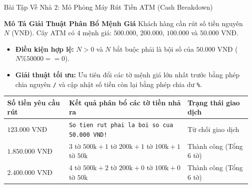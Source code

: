 \documentclass[aspectratio=169, 10pt]{beamer}
\begin{document}
\begin{frame}{Bài Tập Về Nhà 2: Mô Phỏng Máy Rút Tiền ATM (Cash Breakdown)}
  \begin{block}{\textbf{Mô Tả Giải Thuật Phân Bổ Mệnh Giá}}
    Khách hàng cần rút số tiền nguyên $N$ (VNĐ). Cây ATM có 4 mệnh giá: $500.000$, $200.000$, $100.000$ và $50.000$ VNĐ.
    \begin{itemize}
      \item \textbf{Điều kiện hợp lệ:} $N > 0$ và $N$ bắt buộc phải là bội số của $50.000$ VNĐ ($N \% 50000 == 0$).
      \item \textbf{Giải thuật tối ưu:} Ưu tiên đổi các tờ mệnh giá lớn nhất trước bằng phép chia nguyên \texttt{/} và cập nhật số tiền còn lại bằng phép chia dư \texttt{\%}.
    \end{itemize}
  \end{block}
  \begin{table}[h]
    \centering
    \scriptsize
    \begin{tabularx}{\textwidth}{p{2.5cm}Xp{2.8cm}}
      \toprule
      \textbf{Số tiền yêu cầu rút} & \textbf{Kết quả phân bổ các tờ tiền nhả ra} & \textbf{Trạng thái giao dịch} \\
      \midrule
      $123.000$ VNĐ & \texttt{So tien rut phai la boi so cua 50.000 VND!} & Từ chối giao dịch \\
      \addlinespace
      $1.850.000$ VNĐ & $3$ tờ $500\text{k} + 1$ tờ $200\text{k} + 1$ tờ $100\text{k} + 1$ tờ $50\text{k}$ & Thành công (Tổng $6$ tờ) \\
      \addlinespace
      $2.400.000$ VNĐ & $4$ tờ $500\text{k} + 2$ tờ $200\text{k} + 0$ tờ $100\text{k} + 0$ tờ $50\text{k}$ & Thành công (Tổng $6$ tờ) \\
      \bottomrule
    \end{tabularx}
  \end{table}
\end{frame}
\end{document}
